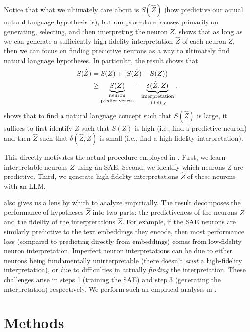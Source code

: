 Notice that what we ultimately care about is $S(\hat{Z})$ (how predictive our actual natural language hypothesis is), but our procedure focuses primarily on generating, selecting, and then interpreting the neuron $Z$.  shows that as long as we can generate a sufficiently high-fidelity interpretation $\hat{Z}$ of each neuron $Z$, then we can focus on finding predictive neurons as a way to ultimately find natural language hypotheses. In particular, the result shows that
\begin{align}
    S(\hat{Z}) &= S(Z) + (S(\hat{Z}) - S(Z))\\
    &\ge \underbrace{S(Z)}_{\scriptsize\shortstack{neuron\\predictiveness}} - \underbrace{\delta(\hat{Z}, Z)}_{\scriptsize\shortstack{interpretation\\fidelity}}.\label{eq:decomposition}
\end{align}
 shows that to find a natural language concept such that $S(\hat{Z})$ is large, it suffices to first identify $Z$ such that $S(Z)$ is high (i.e., find a predictive neuron) and then $\hat{Z}$ such that $\delta(\hat{Z}, Z)$ is small (i.e., find a high-fidelity interpretation).

This directly motivates the actual procedure employed in \ourmethod. First, we learn interpretable neurons $Z$ using an SAE. Second, we identify which neurons $Z$ are predictive. Third, we generate high-fidelity interpretations $\hat{Z}$ of these neurons with an LLM.

 also gives us a lens by which to analyze \ourmethod empirically. The result decomposes the performance of hypotheses $\hat{Z}$ into two parts: the predictiveness of the neurons $Z$ and the fidelity of the interpretations $\hat{Z}.$ For example, if the SAE neurons are similarly predictive to the text embeddings they encode, then most performance loss (compared to predicting directly from embeddings) comes from low-fidelity neuron interpretation. Imperfect neuron interpretations can be due to either neurons being fundamentally uninterpretable (there doesn't \textit{exist} a high-fidelity interpretation), or due to difficulties in actually \textit{finding} the interpretation. These challenges arise in steps 1 (training the SAE) and step 3 (generating the interpretation) respectively. We perform such an empirical analysis in .

\section{Methods}
\label{sec:methods_main}

